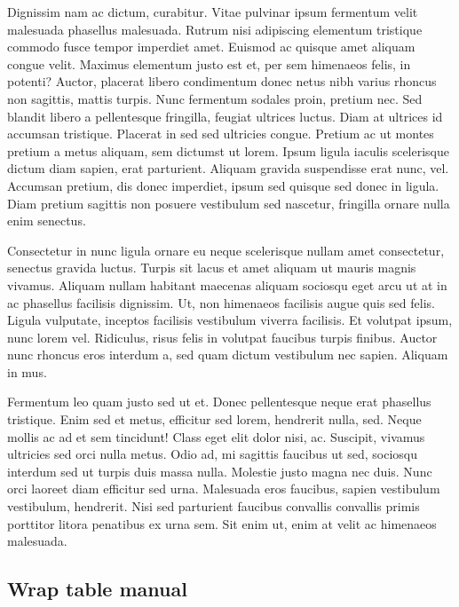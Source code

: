 \documentclass[
  9pt,
  letterpaper,
  DIV=11,
  numbers=noendperiod]{scrartcl}
\begin{document}
Dignissim nam ac dictum, curabitur. Vitae pulvinar ipsum fermentum velit
malesuada phasellus malesuada. Rutrum nisi adipiscing elementum
tristique commodo fusce tempor imperdiet amet. Euismod ac quisque amet
aliquam congue velit. Maximus elementum justo est et, per sem himenaeos
felis, in potenti? Auctor, placerat libero condimentum donec netus nibh
varius rhoncus non sagittis, mattis turpis. Nunc fermentum sodales
proin, pretium nec. Sed blandit libero a pellentesque fringilla, feugiat
ultrices luctus. Diam at ultrices id accumsan tristique. Placerat in sed
sed ultricies congue. Pretium ac ut montes pretium a metus aliquam, sem
dictumst ut lorem. Ipsum ligula iaculis scelerisque dictum diam sapien,
erat parturient. Aliquam gravida suspendisse erat nunc, vel. Accumsan
pretium, dis donec imperdiet, ipsum sed quisque sed donec in ligula.
Diam pretium sagittis non posuere vestibulum sed nascetur, fringilla
ornare nulla enim senectus.

Consectetur in nunc ligula ornare eu neque scelerisque nullam amet
consectetur, senectus gravida luctus. Turpis sit lacus et amet aliquam
ut mauris magnis vivamus. Aliquam nullam habitant maecenas aliquam
sociosqu eget arcu ut at in ac phasellus facilisis dignissim. Ut, non
himenaeos facilisis augue quis sed felis. Ligula vulputate, inceptos
facilisis vestibulum viverra facilisis. Et volutpat ipsum, nunc lorem
vel. Ridiculus, risus felis in volutpat faucibus turpis finibus. Auctor
nunc rhoncus eros interdum a, sed quam dictum vestibulum nec sapien.
Aliquam in mus.

Fermentum leo quam justo sed ut et. Donec pellentesque neque erat
phasellus tristique. Enim sed et metus, efficitur sed lorem, hendrerit
nulla, sed. Neque mollis ac ad et sem tincidunt! Class eget elit dolor
nisi, ac. Suscipit, vivamus ultricies sed orci nulla metus. Odio ad, mi
sagittis faucibus ut sed, sociosqu interdum sed ut turpis duis massa
nulla. Molestie justo magna nec duis. Nunc orci laoreet diam efficitur
sed urna. Malesuada eros faucibus, sapien vestibulum vestibulum,
hendrerit. Nisi sed parturient faucibus convallis convallis primis
porttitor litora penatibus ex urna sem. Sit enim ut, enim at velit ac
himenaeos malesuada.

\newpage{}

\hypertarget{wrap-table-manual}{%
\subsection{Wrap table manual}\label{wrap-table-manual}}
\end{document}
